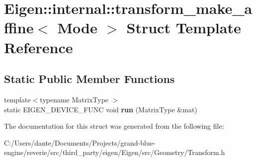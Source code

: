 \hypertarget{struct_eigen_1_1internal_1_1transform__make__affine}{}\section{Eigen\+::internal\+::transform\+\_\+make\+\_\+affine$<$ Mode $>$ Struct Template Reference}
\label{struct_eigen_1_1internal_1_1transform__make__affine}
\subsection*{Static Public Member Functions}
\begin{DoxyCompactItemize}
\item 
\mbox{\label{struct_eigen_1_1internal_1_1transform__make__affine_abb9f3640b1b651e52f356edc84d60bcc}} 
{\footnotesize template$<$typename Matrix\+Type $>$ }\\static E\+I\+G\+E\+N\+\_\+\+D\+E\+V\+I\+C\+E\+\_\+\+F\+U\+NC void {\bfseries run} (Matrix\+Type \&mat)
\end{DoxyCompactItemize}


The documentation for this struct was generated from the following file\+:\begin{DoxyCompactItemize}
\item 
C\+:/\+Users/dante/\+Documents/\+Projects/grand-\/blue-\/engine/reverie/src/third\+\_\+party/eigen/\+Eigen/src/\+Geometry/Transform.\+h\end{DoxyCompactItemize}
